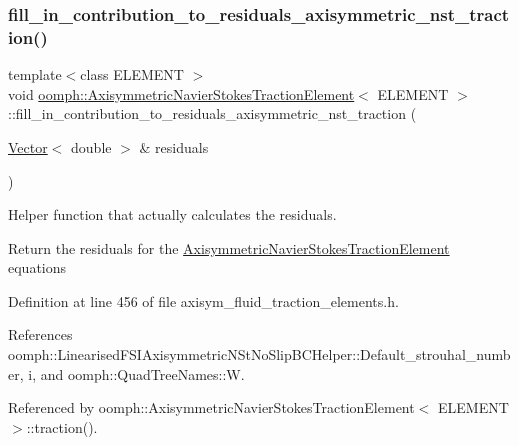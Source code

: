 \subsubsection{\texorpdfstring{fill\+\_\+in\+\_\+contribution\+\_\+to\+\_\+residuals\+\_\+axisymmetric\+\_\+nst\+\_\+traction()}{fill\_in\_contribution\_to\_residuals\_axisymmetric\_nst\_traction()}}
{\footnotesize\ttfamily template$<$class E\+L\+E\+M\+E\+NT $>$ \\
void \hyperlink{classoomph_1_1AxisymmetricNavierStokesTractionElement}{oomph\+::\+Axisymmetric\+Navier\+Stokes\+Traction\+Element}$<$ E\+L\+E\+M\+E\+NT $>$\+::fill\+\_\+in\+\_\+contribution\+\_\+to\+\_\+residuals\+\_\+axisymmetric\+\_\+nst\+\_\+traction (\begin{DoxyParamCaption}\item[{\hyperlink{classoomph_1_1Vector}{Vector}$<$ double $>$ \&}]{residuals }\end{DoxyParamCaption})\hspace{0.3cm}{\ttfamily [protected]}}



Helper function that actually calculates the residuals. 

Return the residuals for the \hyperlink{classoomph_1_1AxisymmetricNavierStokesTractionElement}{Axisymmetric\+Navier\+Stokes\+Traction\+Element} equations 

Definition at line 456 of file axisym\+\_\+fluid\+\_\+traction\+\_\+elements.\+h.



References oomph\+::\+Linearised\+F\+S\+I\+Axisymmetric\+N\+St\+No\+Slip\+B\+C\+Helper\+::\+Default\+\_\+strouhal\+\_\+number, i, and oomph\+::\+Quad\+Tree\+Names\+::W.



Referenced by oomph\+::\+Axisymmetric\+Navier\+Stokes\+Traction\+Element$<$ E\+L\+E\+M\+E\+N\+T $>$\+::traction().

\mbox{\label{classoomph_1_1AxisymmetricNavierStokesTractionElement_a6cf7f8ed52ecccfad185118ffe72ebda}} 
